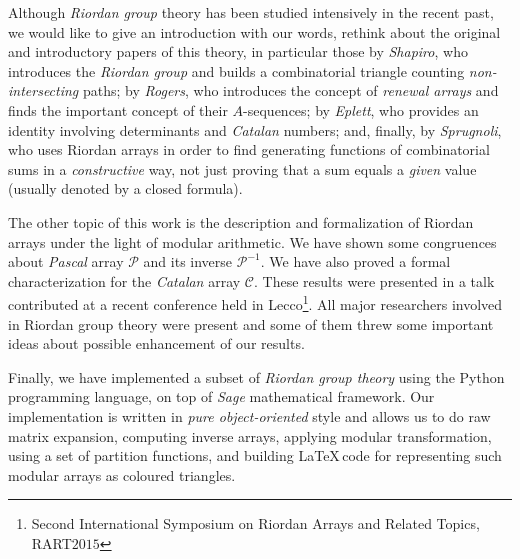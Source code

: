 {Although \emph{Riordan group} theory has been studied intensively in the recent past, we would
like to give an introduction with our words, rethink about the original and
introductory papers of this theory, in particular those by \emph{Shapiro}, who
introduces the \emph{Riordan group} and builds a combinatorial triangle
counting \emph{non-intersecting} paths; by \emph{Rogers}, who introduces the
concept of \emph{renewal arrays} and finds the important concept of their
$A$-sequences; by \emph{Eplett}, who provides an identity involving
determinants and \emph{Catalan} numbers; and, finally, by \emph{Sprugnoli}, who
uses Riordan arrays in order to find generating functions of combinatorial sums
in a \emph{constructive} way, not just proving that a sum equals a \emph{given}
value (usually denoted by a closed formula). 

 The other topic of
this work is the description and formalization of Riordan arrays under the
light of modular arithmetic. We have shown some congruences about \emph{Pascal}
array $\mathcal{P}$ and its inverse $\mathcal{P}^{-1}$. We have also proved a
formal characterization for the \emph{Catalan} array $\mathcal{C}$. These
results were presented in a talk contributed at a recent conference held in
Lecco\footnote{Second International Symposium on Riordan Arrays and Related
Topics, RART$2015$}. All major researchers involved in Riordan group theory
were present and some of them threw some important ideas about possible
enhancement of our results.  

Finally, 
we have implemented a subset of \emph{Riordan group theory} using the
Python programming language, on top of \emph{Sage} mathematical framework.  Our
implementation is written in \emph{pure object-oriented} style and allows us to
do raw matrix expansion, computing inverse arrays, applying modular
    transformation, using a set of partition functions, and building
    \LaTeX\,code for representing such modular arrays as coloured triangles.

}
\fi

\iffalse
\vfill

\pdfbookmark[1]{Zusammenfassung}{Zusammenfassung}
\chapter*{Zusammenfassung}
Kurze Zusammenfassung des Inhaltes in deutscher Sprache\dots
\fi


\endgroup			

\vfill
